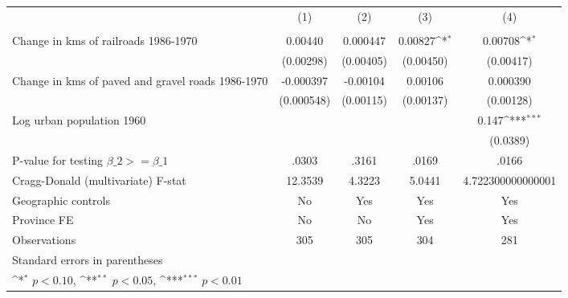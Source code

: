 {
\def\sym#1{\ifmmode^{#1}\else\(^{#1}\)\fi}
\begin{tabular}{l*{4}{c}}
\hline\hline
                &\multicolumn{1}{c}{(1)}&\multicolumn{1}{c}{(2)}&\multicolumn{1}{c}{(3)}&\multicolumn{1}{c}{(4)}\\
                &\multicolumn{1}{c}{}&\multicolumn{1}{c}{}&\multicolumn{1}{c}{}&\multicolumn{1}{c}{}\\
\hline
Change in kms of railroads 1986-1970&  0.00440         & 0.000447         &  0.00827\sym{*}  &  0.00708\sym{*}  \\
                &(0.00298)         &(0.00405)         &(0.00450)         &(0.00417)         \\
[1em]
Change in kms of paved and gravel roads 1986-1970&-0.000397         & -0.00104         &  0.00106         & 0.000390         \\
                &(0.000548)         &(0.00115)         &(0.00137)         &(0.00128)         \\
[1em]
Log urban population 1960&                  &                  &                  &    0.147\sym{***}\\
                &                  &                  &                  & (0.0389)         \\
\hline
P-value for testing $\beta\_{2} >= \beta\_{1}$&    .0303         &    .3161         &    .0169         &    .0166         \\
Cragg-Donald (multivariate) F-stat&  12.3539         &   4.3223         &   5.0441         &4.722300000000001         \\
Geographic controls&       No         &      Yes         &      Yes         &      Yes         \\
Province FE     &       No         &       No         &      Yes         &      Yes         \\
Observations    &      305         &      305         &      304         &      281         \\
\hline\hline
\multicolumn{5}{l}{\footnotesize Standard errors in parentheses}\\
\multicolumn{5}{l}{\footnotesize \sym{*} \(p<0.10\), \sym{**} \(p<0.05\), \sym{***} \(p<0.01\)}\\
\end{tabular}
}
